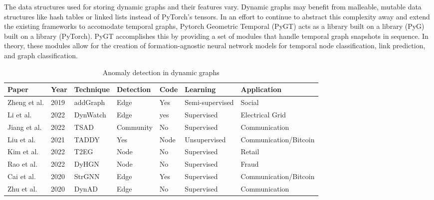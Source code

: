 The data structures used for storing dynamic graphs and their features vary. Dynamic graphs may benefit from malleable, mutable data structures like hash tables or linked lists instead of PyTorch's tensors\cite{fallenvalkyrie_tensors_2021}. In an effort to continue to abstract this complexity away and extend the existing frameworks to accomodate temporal graphs, Pytorch Geometric Temporal (PyGT)\cite{rozemberczki_pytorch_2021} acts as a library built on a library (PyG) built on a library (PyTorch).  PyGT  accomplishes this by providing a set of modules that handle temporal graph snapshots in sequence. In theory, these modules allow for the creation of formation-agnostic neural network models for temporal node classification, link prediction, and graph classification. 

\begin{table}
    \caption{Anomaly detection in dynamic graphs}
    \label{table-2}
    \begin{tabular}{|l|l|l|l|l|l|l|}
        \hline Paper &  Year & Technique & Detection & Code & Learning & Application \\ \hline
        Zheng et al.\cite{zheng_addgraph_2019} & 2019 & addGraph & Edge & Yes & Semi-supervised & Social\\
        Li et al.\cite{li_dynamic_2022} & 2022 & DynWatch  & Edge & yes & Supervised & Electrical Grid\\
        Jiang et al.\cite{jiang_two-stage_2022} & 2022 & TSAD & Community & No & Supervised & Communication\\
        Liu et al.\cite{liu_anomaly_2021}& 2021 & TADDY & Yes & Node & Unsupervised & Communication/Bitcoin\\
        Kim et al.\cite{kim_temporal_2022} & 2022 & T2EG & Node & No & Supervised & Retail \\
        Rao et al.\cite{rao_modelling_2022} & 2022 & DyHGN & Node & No & Supervised & Fraud \\
        Cai et al.\cite{cai_structural_2020} & 2020 & StrGNN & Edge & Yes & Supervised & Communication/Bitcoin\\
        Zhu et al.\cite{zhu_flexible_2020} & 2020 & DynAD & Edge & No & Supervised & Communication \\
        \hline
    \end{tabular}
\end{table}

